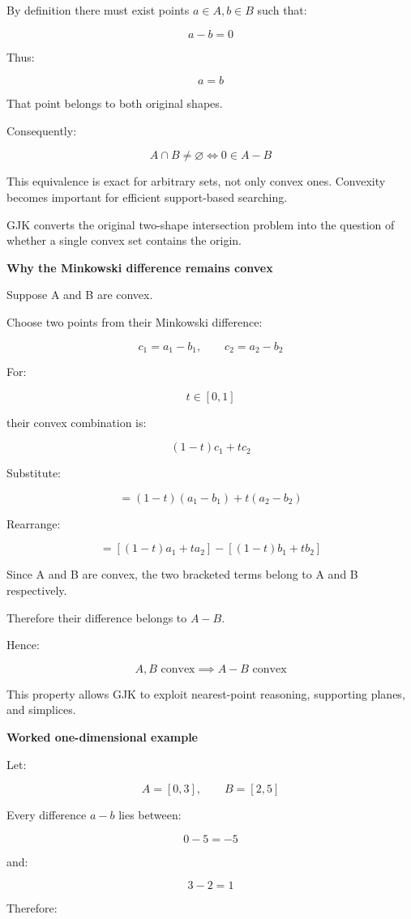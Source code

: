 By definition there must exist points \(a\in A,b\in B\) such that:

\[
a-b=0
\]

Thus:

\[
a=b
\]

That point belongs to both original shapes.

Consequently:

\[
\boxed{ A\cap B\ne\varnothing \iff 0\in A-B }
\]

This equivalence is exact for arbitrary sets, not only convex ones. Convexity becomes important for efficient support-based searching.

GJK converts the original two-shape intersection problem into the question of whether a single convex set contains the origin.

\textbf{Why the Minkowski difference remains convex}

Suppose A and B are convex.

Choose two points from their Minkowski difference:

\[
c_1=a_1-b_1,\qquad c_2=a_2-b_2
\]

For:

\[
t\in[0,1]
\]

their convex combination is:

\[
(1-t)c_1+tc_2
\]

Substitute:

\[
=(1-t)(a_1-b_1)+t(a_2-b_2)
\]

Rearrange:

\[
=[(1-t)a_1+ta_2]-[(1-t)b_1+tb_2]
\]

Since A and B are convex, the two bracketed terms belong to A and B respectively.

Therefore their difference belongs to \(A-B\).

Hence:

\[
\boxed{ A,B\text{ convex}\implies A-B\text{ convex} }
\]

This property allows GJK to exploit nearest-point reasoning, supporting planes, and simplices.

\textbf{Worked one-dimensional example}

Let:

\[
A=[0,3],\qquad B=[2,5]
\]

Every difference \(a-b\) lies between:

\[
0-5=-5
\]

and:

\[
3-2=1
\]

Therefore:

